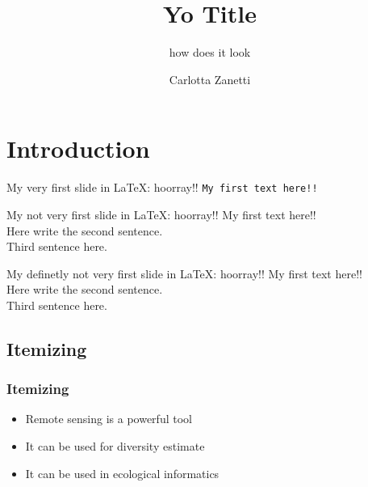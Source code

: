 \documentclass{beamer}
\title{Yo Title}
\subtitle{how does it look}
\author{Carlotta Zanetti}
\institute{
 Alma Mater Studiorum UniBO\\
 \bigskip
 \texttt{[image: giove.jpg]}
 }
\begin{document}
\maketitle


\section{Introduction}

\begin{frame}{My very first slide in LaTeX: hoorray!!}
    \texttt{My first text here!!}
\end{frame}

\begin{frame}{My not very first slide in LaTeX: hoorray!!}
    My first text here!! \\
    \bigskip
    \tiny{Here write the second sentence.} \\
    \bigskip
    Third sentence here.
\end{frame}

\begin{frame}{My definetly not very first slide in LaTeX: hoorray!!}
    My first text here!! \\
    Here write the second sentence. \\
    Third sentence here.
\end{frame}

\subsection{Itemizing}
\begin{frame}
 \frametitle{Itemizing}
 \begin{itemize}
  \item Remote sensing is a powerful tool
  \item It can be used for diversity estimate
  \item It can be used in ecological informatics
 \end{itemize}
\end{frame}
\end{document}

